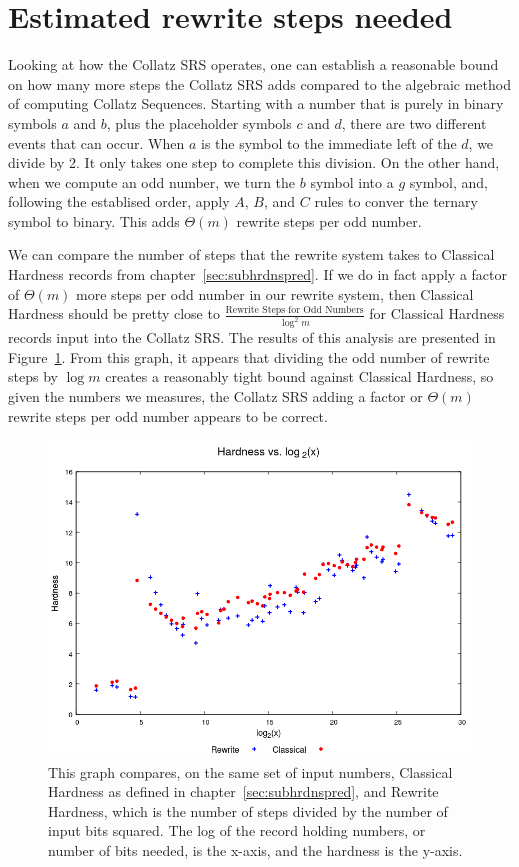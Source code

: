 \section{Estimated rewrite steps needed} \label{subsec:estrwsteps}
Looking at how the Collatz SRS operates, one can establish a reasonable bound on how many more steps the Collatz SRS adds compared to the algebraic method of computing Collatz Sequences. Starting with a number that is purely in binary symbols $a$ and $b$, plus the placeholder symbols $c$ and $d$, there are two different events that can occur. When $a$ is the symbol to the immediate left of the $d$, we divide by 2. It only takes one step to complete this division. On the other hand, when we compute an odd number, we turn the $b$ symbol into a $g$ symbol, and, following the establised order, apply $A$, $B$, and $C$ rules to conver the ternary symbol to binary. This adds $\Theta(m)$ rewrite steps per odd number. \par
We can compare the number of steps that the rewrite system takes to Classical Hardness records from chapter~\ref{sec:subhrdnspred}. If we do in fact apply a factor of $\Theta(m)$ more steps per odd number in our rewrite system, then Classical Hardness should be pretty close to $\frac{\text{Rewrite Steps for Odd Numbers}}{\log^2{m}}$ for Classical Hardness records input into the Collatz SRS. The results of this analysis are presented in Figure~\ref{fig:rvc_log}. From this graph, it appears that dividing the odd number of rewrite steps by $\log{m}$ creates a reasonably tight bound against Classical Hardness, so given the numbers we measures, the Collatz SRS adding a factor or $\Theta(m)$ rewrite steps per odd number appears to be correct.
\begin{figure}
    \centering
    \includegraphics[scale=0.75]{ModAvoidanceAnalysisPics/RvC_vs_log.png}
    \caption{This graph compares, on the same set of input numbers, Classical Hardness as defined in chapter~\ref{sec:subhrdnspred}, and Rewrite Hardness, which is the number of steps divided by the number of input bits squared. The log of the record holding numbers, or number of bits needed, is the x-axis, and the hardness is the y-axis.}
    \label{fig:rvc_log}
\end{figure}


